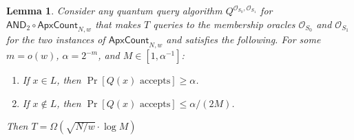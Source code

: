\documentclass[10pt,a4paper]{article}
\newtheorem{lemma}[theorem]{Lemma}
\newcommand{\<}{\langle}
\renewcommand{\>}{\rangle}
\newcommand{\ApxCount}{\mathsf{ApxCount}_{N,w}}
\newcommand{\AndApxCount}{\mathsf{AND}_2\circ\mathsf{ApxCount}_{N,w}}
\begin{document}
\begin{lemma}
\label{lem:betterforqma}
Consider any quantum query algorithm $Q^{\mathcal{O}_{S_{0}},\mathcal{O}_{S_{1}}}$
for $\AndApxCount$
that makes $T$ queries to the membership oracles
$\mathcal{O}_{S_{0}}$ and $\mathcal{O}_{S_{1}}$
for the two instances of $\ApxCount$ and
satisfies the following. For some $m=o(w)$, $\alpha=2^{-m}$, and $M \in [1, \alpha^{-1}]$:
\begin{enumerate}
\item If $x \in L$, then $\Pr\left[Q(x) \text{ accepts}\right] \ge
\alpha$.
\item If $x \not\in L$, then $\Pr\left[Q(x) \text{ accepts}\right] \le
\alpha/(2 M)$.
\end{enumerate}
Then $T = \Omega\left(\sqrt{N/w} \cdot \log M\right)$
\end{lemma}
\end{document}
